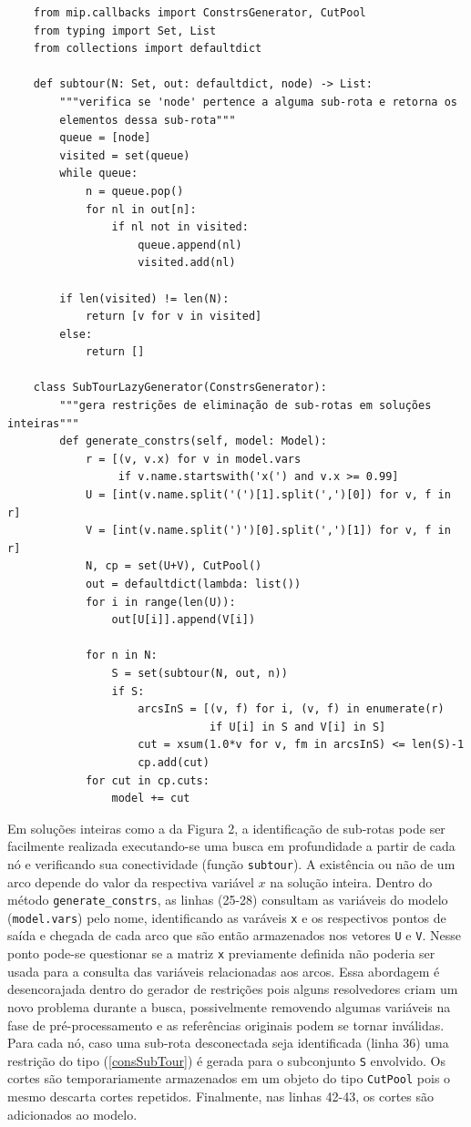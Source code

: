 \documentclass[a4paper,11pt,fleqn]{article}
\begin{document}
\begin{verbatim}
    from mip.callbacks import ConstrsGenerator, CutPool
    from typing import Set, List
    from collections import defaultdict

    def subtour(N: Set, out: defaultdict, node) -> List:
        """verifica se 'node' pertence a alguma sub-rota e retorna os 
        elementos dessa sub-rota"""
        queue = [node]
        visited = set(queue)
        while queue:
            n = queue.pop()
            for nl in out[n]:
                if nl not in visited:
                    queue.append(nl)
                    visited.add(nl)

        if len(visited) != len(N):
            return [v for v in visited]
        else:
            return []

    class SubTourLazyGenerator(ConstrsGenerator):
        """gera restrições de eliminação de sub-rotas em soluções inteiras"""
        def generate_constrs(self, model: Model):
            r = [(v, v.x) for v in model.vars
                 if v.name.startswith('x(') and v.x >= 0.99]
            U = [int(v.name.split('(')[1].split(',')[0]) for v, f in r]
            V = [int(v.name.split(')')[0].split(',')[1]) for v, f in r]
            N, cp = set(U+V), CutPool()
            out = defaultdict(lambda: list())
            for i in range(len(U)):
                out[U[i]].append(V[i])

            for n in N:
                S = set(subtour(N, out, n))
                if S:
                    arcsInS = [(v, f) for i, (v, f) in enumerate(r)
                               if U[i] in S and V[i] in S]
                    cut = xsum(1.0*v for v, fm in arcsInS) <= len(S)-1
                    cp.add(cut)
            for cut in cp.cuts:
                model += cut
\end{verbatim}

Em soluções inteiras como a da Figura 2, a identificação de sub-rotas pode ser facilmente realizada executando-se uma busca em profundidade a partir de cada nó e verificando sua conectividade (função \texttt{subtour}). A existência ou não de um arco depende do valor da respectiva variável $x$ na solução inteira. Dentro do método \texttt{generate\_constrs}, as linhas (25-28) consultam as variáveis do modelo (\texttt{model.vars}) pelo nome, identificando as varáveis \texttt{x} e os respectivos pontos de saída e chegada de cada arco que são então armazenados nos vetores \texttt{U} e \texttt{V}. Nesse ponto pode-se questionar se a matriz \texttt{x} previamente definida não poderia ser usada para a consulta das variáveis relacionadas aos arcos. Essa abordagem é desencorajada dentro do gerador de restrições pois alguns resolvedores criam um novo problema durante a busca, possivelmente removendo algumas variáveis na fase de pré-processamento e as referências originais podem se tornar inválidas. Para cada nó, caso uma sub-rota desconectada seja identificada (linha 36) uma restrição do tipo (\ref{consSubTour}) é gerada para o subconjunto \texttt{S} envolvido. Os cortes são temporariamente armazenados em um objeto do tipo \texttt{CutPool} pois o mesmo descarta cortes repetidos. Finalmente, nas linhas 42-43, os cortes são adicionados ao modelo.
\end{document}
